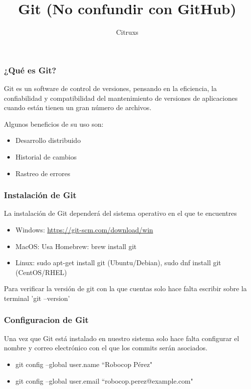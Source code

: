 \documentclass[12pt]{beamer}
\begin{document}
	\author{Citruxs}
	\title{Git  (No confundir con GitHub)}
	\begin{frame}[plain]
		\maketitle
	\end{frame}
	
	\begin{frame}
		\frametitle{¿Qué es Git?}
		Git es un software de control de versiones, pensando en la eficiencia, la confiabilidad y compatibilidad del mantenimiento de versiones de aplicaciones cuando están tienen un gran número de archivos.
		
		Algunos beneficios de su uso son:
		\begin{itemize}
			\item Desarrollo distribuido
			\item Historial de cambios
			\item Rastreo de errores
		\end{itemize}
	\end{frame}
	
	\begin{frame}
		\frametitle{Instalación de Git}
		La instalación de Git dependerá del sistema operativo en el que te encuentres
		\begin{itemize}
			\item Windows: \url{https://git-scm.com/download/win}
			\item MacOS: Usa Homebrew: brew install git
			\item Linux: sudo apt-get install git (Ubuntu/Debian), sudo dnf install git (CentOS/RHEL)
		\end{itemize}
		Para verificar la versión de git con la que cuentas solo hace falta escribir sobre la terminal 'git --version'
	\end{frame}
	
	\begin{frame}
		\frametitle{Configuracion de Git}
		Una vez que Git está instalado en nuestro sistema solo hace falta configurar el nombre y correo electrónico con el que los commits serán asociados.
		
		\begin{itemize}
			\item git config --global user.name ``Robocop Pérez"
			\item git config --global user.email ``robocop.perez@example.com"
		\end{itemize}
	\end{frame}
	
\end{document}
